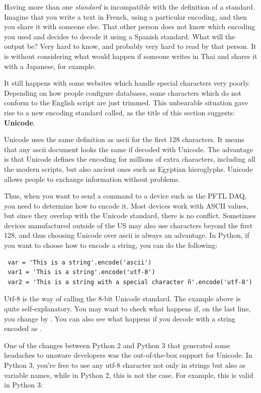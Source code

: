 Having more than one \textit{standard} is incompatible with the definition of a standard. Imagine that you write a text in French, using a particular encoding, and then you share it with someone else. That other person does not know which encoding you used and decides to decode it using a Spanish standard. What will the output be? Very hard to know, and probably very hard to read by that person. It is without considering what would happen if someone writes in Thai and shares it with a Japanese, for example.

It still happens with some websites which handle special characters very poorly. Depending on how people configure databases, some characters which do not conform to the English script are just trimmed. This unbearable situation gave rise to a new encoding standard called, as the title of this section suggests: \textbf{Unicode}.

Unicode uses the same definition as ascii for the first 128 characters. It means that any ascii document looks the same if decoded with Unicode. The advantage is that Unicode defines the encoding for millions of extra characters, including all the modern scripts, but also ancient ones such as Egyptian hieroglyphs. Unicode allows people to exchange information without problems.

Thus, when you want to send a command to a device such as the {PFTL DAQ}, you need to determine how to encode it. Most devices work with ASCII values, but since they overlap with the Unicode standard, there is no conflict. Sometimes devices manufactured outside of the US may also use characters beyond the first 128, and thus choosing Unicode over ascii is always an advantage. In Python, if you want to choose how to encode a string, you can do the following:

\begin{verbatim}
 var = 'This is a string'.encode('ascii')
 var1 = 'This is a string'.encode('utf-8')
 var2 = 'This is a string with a special character ñ'.encode('utf-8')
\end{verbatim}

Utf-8 is the way of calling the 8-bit Unicode standard. The example above is quite self-explanatory. You may want to check what happens if, on the last line, you change  by . You can also see what happens if you decode with  a string encoded as .

One of the changes between Python 2 and Python 3 that generated some headaches to unaware developers was the out-of-the-box support for Unicode. In Python 3, you're free to use any utf-8 character not only in strings but also as variable names, while in Python 2, this is not the case. For example, this is valid in Python 3:

